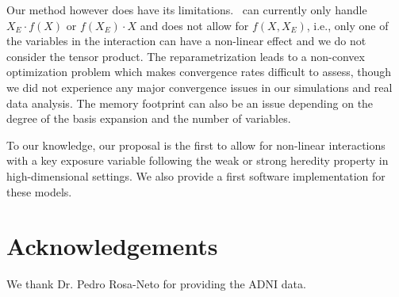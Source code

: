 Our method however does have its limitations. \sail ~can currently only handle $X_E \cdot f(X)$ or $f(X_E) \cdot X$ and does not allow for $f(X, X_E)$, i.e., only one of the variables in the interaction can have a non-linear effect and we do not consider the tensor product. The reparametrization leads to a non-convex optimization problem which makes convergence rates difficult to assess, though we did not experience any major convergence issues in our simulations and real data analysis. The memory footprint can also be an issue depending on the degree of the basis expansion and the number of variables. 

To our knowledge, our proposal is the first to allow for non-linear interactions with a key exposure variable following the weak or strong heredity property in high-dimensional settings. We also provide a first software implementation for these models. 

\section*{Acknowledgements}
We thank Dr. Pedro Rosa-Neto for providing the ADNI data. 
